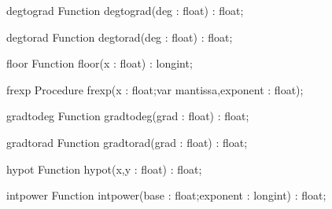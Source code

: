 \FPCexample{}


\begin{function}{degtograd}
\Declaration
Function degtograd(deg : float) : float;
\Description

\Errors
\SeeAlso
\end{function}

\FPCexample{}


\begin{function}{degtorad}
\Declaration
Function degtorad(deg : float) : float;
\Description

\Errors
\SeeAlso
\end{function}

\FPCexample{}


\begin{function}{floor}
\Declaration
Function floor(x : float) : longint;
\Description

\Errors
\SeeAlso
\end{function}

\FPCexample{}


\begin{procedure}{frexp}
\Declaration
Procedure frexp(x : float;var mantissa,exponent : float);
\Description

\Errors
\SeeAlso
\end{procedure}

\FPCexample{}


\begin{function}{gradtodeg}
\Declaration
Function gradtodeg(grad : float) : float;
\Description

\Errors
\SeeAlso
\end{function}

\FPCexample{}


\begin{function}{gradtorad}
\Declaration
Function gradtorad(grad : float) : float;
\Description

\Errors
\SeeAlso
\end{function}

\FPCexample{}


\begin{function}{hypot}
\Declaration
Function hypot(x,y : float) : float;
\Description

\Errors
\SeeAlso
\end{function}

\FPCexample{}


\begin{function}{intpower}
\Declaration
Function intpower(base : float;exponent : longint) : float;
\Description

\Errors
\SeeAlso
\end{function}

